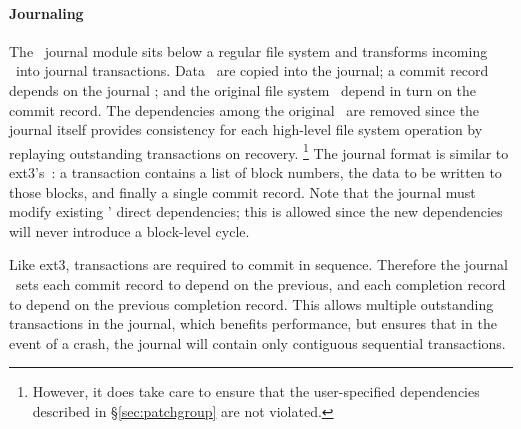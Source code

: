 
\paragraph{Journaling}
\label{sec:using:journal}

\begin{comment}
In a journaling file system, changes to disk structures are grouped into
\emph{transactions} that commit atomically.
%
Any change in a transaction is first copied into an on-disk journal.
%
A single \emph{commit record} block is written to the journal once the
transaction's changes are stably committed there.
%
This record commits the transaction itself, allowing its changes to be
written into the main body of the file system in any order.
%
If the system crashes, the journal information is used to recover the main
file system from its possibly-incomplete state.
%
Once all the transaction's changes are written, a \emph{completion record}
is written to the journal to mark the transaction as complete; that portion
of the journal may now be reused.
\end{comment}

The \Kudos\ journal module sits below a regular file system and transforms
incoming \patches\ into journal transactions.
%
Data \patches\ are copied into the journal; a commit record depends on the
journal \patches; and the original file system \patches\ depend in turn on the
commit record.
%
The dependencies among the original \patches\ are removed since the journal
itself provides consistency for each high-level file system operation by
replaying outstanding transactions on recovery.
\footnote{However, it does take care to ensure that the user-specified
dependencies described in \S\ref{sec:patchgroup} are not violated.}
%
The journal format is similar to ext3's~\cite{tweedie98journaling}: a
transaction contains a list of block numbers, the data to be written to
those blocks, and finally a single commit record.
%
%
Note that the journal must modify existing \patches' direct dependencies;
this is allowed since the new dependencies will never introduce a
block-level cycle.

Like ext3, transactions are required to commit in sequence. Therefore the
journal \module\ sets each commit record to depend on the previous, and each
completion record to depend on the previous completion record. This allows
multiple outstanding transactions in the journal, which benefits performance,
but ensures that in the event of a crash, the journal will contain only
contiguous sequential transactions.

